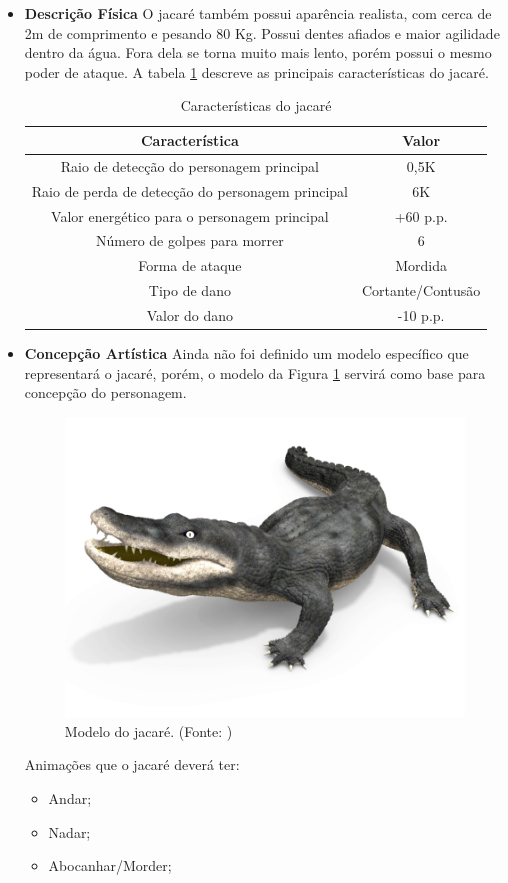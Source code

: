 \begin{itemize}
\item {\bf Descrição Física}
O jacaré também possui aparência realista, com cerca de 2m de comprimento e
 pesando 80 Kg. Possui dentes afiados e maior agilidade dentro da água.
 Fora dela se torna muito mais lento, porém possui o mesmo poder de ataque.
 A tabela \ref{table:jacare} descreve as principais características do jacaré.

\begin{table}[H]
\begin{center}
\begin{tabular}{|c|c|}
\hline 
\textbf{Característica} & \textbf{Valor} \\ 
\hline 
Raio de detecção do personagem principal & 0,5K \\ 
\hline 
Raio de perda de detecção do personagem principal & 6K \\ 
\hline 
Valor energético para o personagem principal & +60 p.p. \\ 
\hline 
Número de golpes para morrer & 6 \\ 
\hline 
Forma de ataque & Mordida \\ 
\hline 
Tipo de dano & Cortante/Contusão \\ 
\hline 
Valor do dano & -10 p.p. \\ 
\hline 
\end{tabular} 
\caption{Características do jacaré}
\label{table:jacare}
\end{center}
\end{table}

\item {\bf Concepção Artística}
Ainda não foi definido um modelo específico que representará o jacaré,
 porém, o modelo da Figura \ref{img:jacare} servirá como base para concepção do
 personagem.
\newpage
\begin{figure}[H]
 \centering
 \includegraphics[scale=1]{Imagens/jacare01.png}
 \caption{Modelo do jacaré. (Fonte: \cite{bib:jacare01})}
\label{img:jacare}
\end{figure}

Animações que o jacaré deverá ter:
\begin{itemize}
\item Andar;
\item Nadar;
\item Abocanhar/Morder;
\end{itemize}
\end{itemize}

